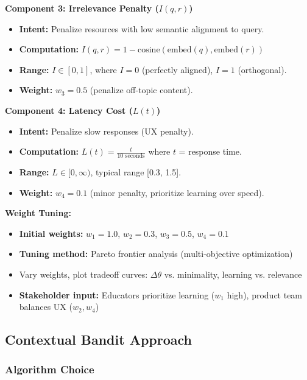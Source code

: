 \documentclass[11pt,letterpaper]{article}
\begin{document}
\textbf{Component 3: Irrelevance Penalty ($I(q, r)$)}
\begin{itemize}
\item \textbf{Intent:} Penalize resources with low semantic alignment to query.
\item \textbf{Computation:} $I(q, r) = 1 - \text{cosine}(\text{embed}(q), \text{embed}(r))$
\item \textbf{Range:} $I \in [0, 1]$, where $I=0$ (perfectly aligned), $I=1$ (orthogonal).
\item \textbf{Weight:} $w_3 = 0.5$ (penalize off-topic content).
\end{itemize}

\textbf{Component 4: Latency Cost ($L(t)$)}
\begin{itemize}
\item \textbf{Intent:} Penalize slow responses (UX penalty).
\item \textbf{Computation:} $L(t) = \frac{t}{10 \text{ seconds}}$ where $t$ = response time.
\item \textbf{Range:} $L \in [0, \infty)$, typical range [0.3, 1.5].
\item \textbf{Weight:} $w_4 = 0.1$ (minor penalty, prioritize learning over speed).
\end{itemize}

\textbf{Weight Tuning:}
\begin{itemize}
\item \textbf{Initial weights:} $w_1 = 1.0$, $w_2 = 0.3$, $w_3 = 0.5$, $w_4 = 0.1$
\item \textbf{Tuning method:} Pareto frontier analysis (multi-objective optimization)
\item Vary weights, plot tradeoff curves: $\Delta\theta$ vs. minimality, learning vs. relevance
\item \textbf{Stakeholder input:} Educators prioritize learning ($w_1$ high), product team balances UX ($w_2, w_4$)
\end{itemize}

\subsection{Contextual Bandit Approach}

\subsubsection{Algorithm Choice}
\end{document}
